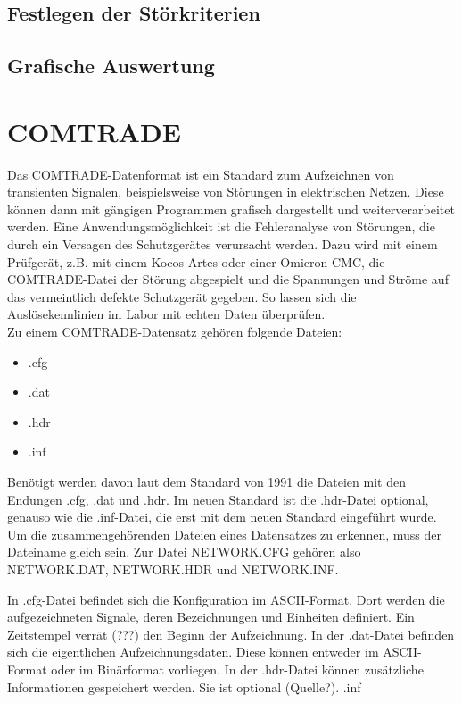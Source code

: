 \documentclass{scrartcl}
\begin{document}
\begin{onehalfspace}
\subsection{Festlegen der Störkriterien}
\subsection{Grafische Auswertung}


\section{COMTRADE}
Das COMTRADE-Datenformat ist ein Standard zum Aufzeichnen von transienten Signalen, beispielsweise von Störungen in elektrischen Netzen. Diese können dann mit gängigen Programmen grafisch dargestellt und weiterverarbeitet werden. Eine Anwendungsmöglichkeit ist die Fehleranalyse von Störungen, die durch ein Versagen des Schutzgerätes verursacht werden. Dazu wird mit einem Prüfgerät, z.B. mit einem Kocos Artes oder einer Omicron CMC, die COMTRADE-Datei der Störung \glqq abgespielt\grqq{} und die Spannungen und Ströme auf das vermeintlich defekte Schutzgerät gegeben. So lassen sich die Auslösekennlinien im Labor mit echten Daten überprüfen. \\ Zu einem COMTRADE-Datensatz gehören folgende Dateien:

\begin{itemize}
\item .cfg
\item .dat
\item .hdr
\item .inf
\end{itemize}
Benötigt werden davon laut dem Standard von 1991 die Dateien mit den Endungen .cfg, .dat und .hdr. Im neuen Standard ist die .hdr-Datei optional, genauso wie die .inf-Datei, die erst mit dem neuen Standard eingeführt wurde. Um die zusammengehörenden Dateien eines Datensatzes zu erkennen, muss der Dateiname gleich sein. Zur Datei NETWORK.CFG gehören also NETWORK.DAT, NETWORK.HDR und NETWORK.INF.

In .cfg-Datei befindet sich die Konfiguration im ASCII-Format. Dort werden die aufgezeichneten Signale, deren Bezeichnungen und Einheiten definiert. Ein Zeitstempel verrät (???) den Beginn der Aufzeichnung. In der .dat-Datei befinden sich die eigentlichen Aufzeichnungsdaten. Diese können entweder im ASCII-Format oder im Binärformat vorliegen. In der .hdr-Datei können zusätzliche Informationen gespeichert werden. Sie ist optional (Quelle?). .inf


\end{onehalfspace}
\end{document}
